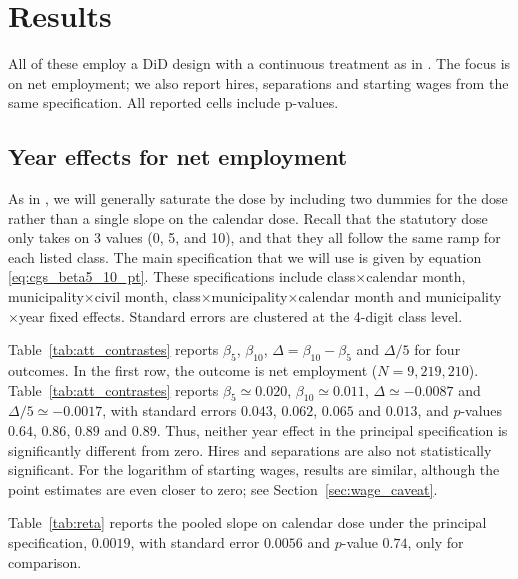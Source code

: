 \documentclass[12pt,a4paper]{article}
\begin{document}
\section{Results}
\label{sec:results}

All of these employ a DiD design with a continuous treatment as in \citet{callaway2024}. The focus is on net employment; we also report hires, separations and starting wages from the same specification. All reported cells include p-values.

\subsection{Year effects for net employment}

As in \citet{callaway2024}, we will generally saturate the dose by including two dummies for the dose rather than a single slope on the calendar dose. Recall that the statutory dose only takes on 3 values (0, 5, and 10), and that they all follow the same ramp for each listed class. The main specification that we will use is given by equation \eqref{eq:cgs_beta5_10_pt}. These specifications include class$\times$calendar month, municipality$\times$civil month, class$\times$municipality$\times$calendar month and municipality$\times$year fixed effects. Standard errors are clustered at the 4-digit class level.

Table~\ref{tab:att_contrastes} reports $\beta_5$, $\beta_{10}$, $\Delta=\beta_{10}-\beta_5$ and $\Delta/5$ for four outcomes. In the first row, the outcome is net employment ($N=9{,}219{,}210$). Table~\ref{tab:att_contrastes} reports $\beta_5\simeq 0.020$, $\beta_{10}\simeq 0.011$, $\Delta\simeq -0.0087$ and $\Delta/5\simeq -0.0017$, with standard errors $0.043$, $0.062$, $0.065$ and $0.013$, and $p$-values $0.64$, $0.86$, $0.89$ and $0.89$. Thus, neither year effect in the principal specification is significantly different from zero. Hires and separations are also not statistically significant. For the logarithm of starting wages, results are similar, although the point estimates are even closer to zero; see Section~\ref{sec:wage_caveat}.

Table~\ref{tab:reta} reports the pooled slope on calendar dose under the principal specification, $0.0019$, with standard error $0.0056$ and $p$-value $0.74$, only for comparison.
\end{document}
